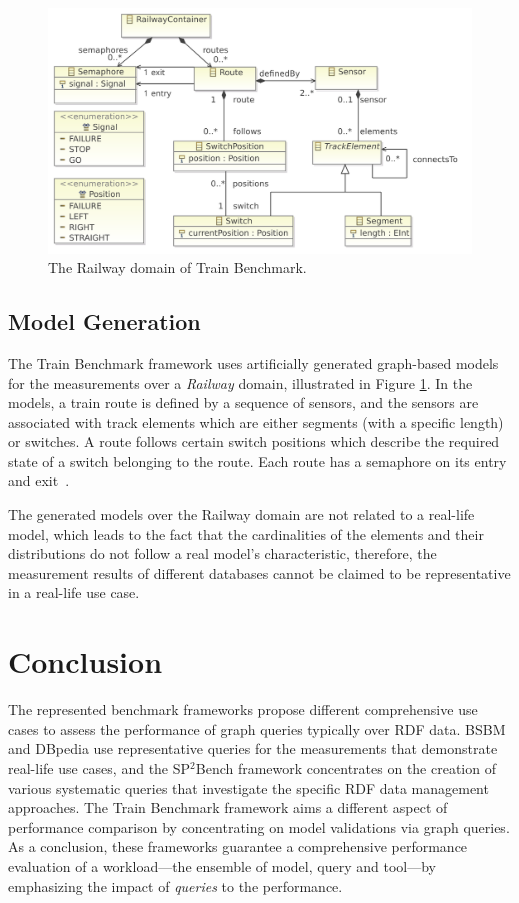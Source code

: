 \begin{figure}[!ht]
	\centering
	\includegraphics[width=150mm, keepaspectratio]{figures/railway-containments.pdf}
	\caption{The Railway domain of Train Benchmark.}
	\label{fig:tb_domain}
\end{figure}

\subsection{Model Generation}

The Train Benchmark framework uses artificially generated graph-based models for the measurements over a \textit{Railway} domain, illustrated in Figure \ref{fig:tb_domain}. In the models, a train route is defined by a sequence of sensors, and the sensors are associated with track elements which are either segments (with a specific length) or switches. A route follows certain switch positions which describe the required state of a switch belonging to the route. Each route has a semaphore on its entry and exit~\cite{train_ttc}.

The generated models over the Railway domain are not related to a real-life model, which leads to the fact that the cardinalities of the elements and their distributions do not follow a real model's characteristic, therefore, the measurement results of different databases cannot be claimed to be representative in a real-life use case.

\section{Conclusion} \label{sec:benchmark_conclusions}

The represented benchmark frameworks propose different comprehensive use cases to assess the performance of graph queries typically over RDF data. BSBM and DBpedia use representative queries for the measurements that demonstrate real-life use cases, and the SP$^2$Bench framework concentrates on the creation of various systematic queries that investigate the specific RDF data management approaches. The Train Benchmark framework aims a different aspect of performance comparison by concentrating on model validations via graph queries. As a conclusion, these frameworks guarantee a comprehensive performance evaluation of a workload---the ensemble of model, query and tool---by emphasizing the impact of \textit{queries} to the performance.

